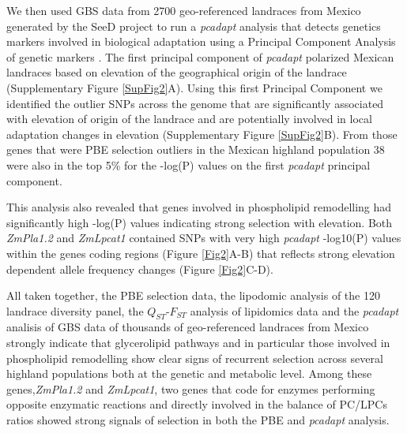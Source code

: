 \documentclass[9pt,twocolumn,twoside,lineno]{gsajnl}
\begin{document}
We then used GBS data from 2700 geo-referenced landraces from Mexico generated by the SeeD project \citep{Romero_Navarro2017-cn, Gates2019-xu} to run a \textit{pcadapt} analysis that detects genetics markers involved in biological adaptation using a Principal Component Analysis of genetic markers \citep{Luu2017-ws}. 
The first principal component of \textit{pcadapt} polarized Mexican landraces based on elevation of the geographical origin of the landrace (Supplementary Figure \ref{SupFig2}A). 
Using this first Principal Component we identified the outlier SNPs across the genome that are significantly associated with elevation of origin of the landrace and are potentially involved in local adaptation changes in elevation (Supplementary Figure \ref{SupFig2}B). 
From those genes that were PBE selection outliers in the Mexican highland population 38 were also in the top 5\% for the -log(P) values on the first \textit{pcadapt} principal component. 

This analysis also revealed that genes involved in phospholipid remodelling had significantly high -log(P) values indicating strong selection with elevation. 
Both \textit{ZmPla1.2} and \textit{ZmLpcat1} contained SNPs with very high \textit{pcadapt} -log10(P) values within the genes coding regions (Figure \ref{Fig2}A-B) that reflects strong elevation dependent allele frequency changes  (Figure \ref{Fig2}C-D).

All taken together, the PBE selection data, the lipodomic analysis of the 120 landrace diversity panel, the $Q_{ST}$-$F_{ST}$ analysis of lipidomics data and the \textit{pcadapt} analisis of GBS data of thousands of geo-referenced landraces from Mexico strongly indicate that glycerolipid pathways and in particular those involved in phospholipid remodelling show clear signs of recurrent selection across several highland populations both at the genetic and metabolic level. 
Among these genes,\textit{ZmPla1.2} and \textit{ZmLpcat1}, two genes that code for enzymes performing opposite enzymatic reactions and directly involved in the balance of PC/LPCs ratios showed strong signals of selection in both the PBE and \textit{pcadapt} analysis.    
\end{document}
